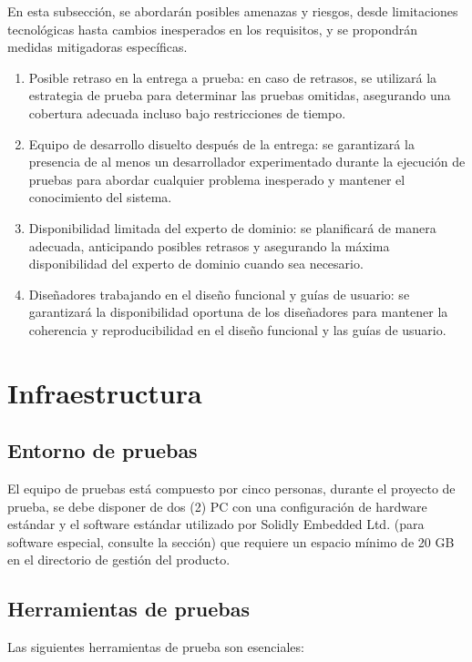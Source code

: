\documentclass[12pt,a4paper, twoside]{article} %
\begin{document}
En esta subsección, se abordarán posibles amenazas y riesgos, desde limitaciones tecnológicas hasta cambios inesperados en los requisitos, y se propondrán medidas mitigadoras específicas. 

\begin{enumerate}
  \item Posible retraso en la entrega a prueba: en caso de retrasos, se utilizará la estrategia de prueba para determinar las pruebas omitidas, asegurando una cobertura adecuada incluso bajo restricciones de tiempo.
  \item Equipo de desarrollo disuelto después de la entrega: se garantizará la presencia de al menos un desarrollador experimentado durante la ejecución de pruebas para abordar cualquier problema inesperado y mantener el conocimiento del sistema.
  \item Disponibilidad limitada del experto de dominio: se planificará de manera adecuada, anticipando posibles retrasos y asegurando la máxima disponibilidad del experto de dominio cuando sea necesario.
  \item Diseñadores trabajando en el diseño funcional y guías de usuario: se garantizará la disponibilidad oportuna de los diseñadores para mantener la coherencia y reproducibilidad en el diseño funcional y las guías de usuario.
\end{enumerate}

\section{Infraestructura}

\subsection{Entorno de pruebas}

El equipo de pruebas está compuesto por cinco personas, durante el proyecto de prueba, se debe disponer de dos (2) PC con una configuración de hardware estándar y el software estándar utilizado por Solidly Embedded Ltd. (para software especial, consulte la sección) que requiere un espacio mínimo de 20 GB en el directorio de gestión del producto.

\subsection{Herramientas de pruebas}

Las siguientes herramientas de prueba son esenciales:
\end{document}
